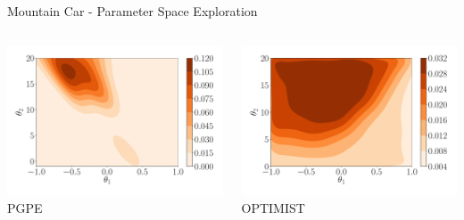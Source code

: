 \begin{frame}{Mountain Car - Parameter Space Exploration}
\begin{columns}
	\begin{column}{0.5\linewidth}
	\centering
		\includegraphics[width=\linewidth]{Images/MCgainPGPE}\\
		PGPE
	\end{column}
	
	\begin{column}{0.5\linewidth}
	\centering
		\includegraphics[width=\linewidth]{Images/MCgainOPTIMIST}\\
		OPTIMIST
	\end{column}	
\end{columns}
\end{frame}
